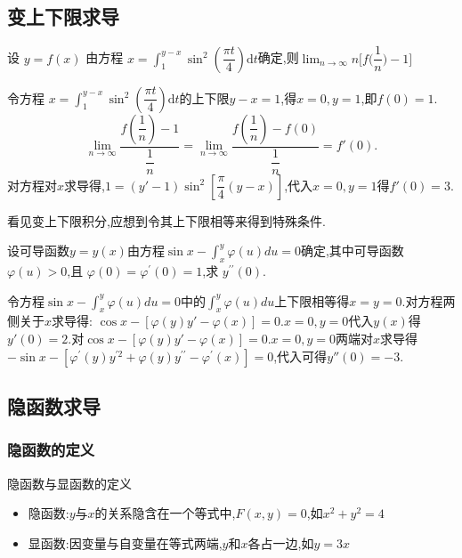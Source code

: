 \documentclass[8pt a4paper, oneside, UTF8]{ctexbook}  %
\begin{document}
\begin{sloppypar}
    \subsection{变上下限求导}
    \begin{problem}
    设 $y=f(x)$ 由方程 $x=\int_1^{y-x}\sin^2\left(\dfrac{\pi t}4\right)\mathrm{d}t$确定,则$\lim_{n\to\infty}n\bigg[f\bigg(\dfrac1n\bigg)-1\bigg]$
    \end{problem}
    \begin{solution}
        令方程 $x=\int_1^{y-x}\sin^2\left(\dfrac{\pi t}4\right)\mathrm{d}t$的上下限$y-x=1$,得$x=0,y=1$,即$f(0)=1$.
        $$\lim_{n\to \infty}\dfrac{f(\dfrac{1}{n})-1}{\dfrac{1}{n}}=\lim_{n\to \infty}\dfrac{f(\dfrac{1}{n})-f(0)}{\dfrac{1}{n}}=f'(0).$$
        对方程对$x$求导得,$1=(y'-1) \sin^2 [\dfrac{\pi}{4}(y-x)]$,代入$x=0,y=1$得$f'(0)=3.$
    \end{solution}
    \begin{note}
        看见变上下限积分,应想到令其上下限相等来得到特殊条件.
    \end{note}
    \begin{problem}
    设可导函数$y=y(x)$由方程$\sin x- \int _x^y\varphi ( u) du= 0$确定,其中可导函数$\varphi(u)>0$,且 $\varphi(0)=\varphi^\prime(0)=1$,求 $y^{\prime\prime}(0).$
    \end{problem}
    \begin{solution}
        令方程$\sin x- \int _x^y\varphi (u) du= 0$中的$\int_x^y \varphi(u)du $上下限相等得$x=y=0$.对方程两侧关于$x$求导得: $\cos x-[\varphi(y)y'-\varphi(x)]=0$.$x=0,y=0$代入$y(x)$得$y'(0)=2$.对$\cos x-[\varphi(y)y'-\varphi(x)]=0$.$x=0,y=0$两端对$x$求导得$-\sin x-\left[\varphi^{\prime}(y)y^{\prime2}+\varphi(y)y^{\prime\prime}-\varphi^{\prime}(x)\right]=0 $,代入可得$y''(0)=-3$.
    \end{solution}
    \subsection{隐函数求导}
    \subsubsection{隐函数的定义}
    \begin{defn}{隐函数与显函数的定义}{}
        \begin{itemize}
            \item 隐函数:$y$与$x$的关系隐含在一个等式中,$F(x,y)=0$,如$x^2+y^2=4$
            \item  显函数:因变量与自变量在等式两端,$y$和$x$各占一边,如$y=3x$​
        \end{itemize}
    \end{defn}

\end{sloppypar}
\end{document}
